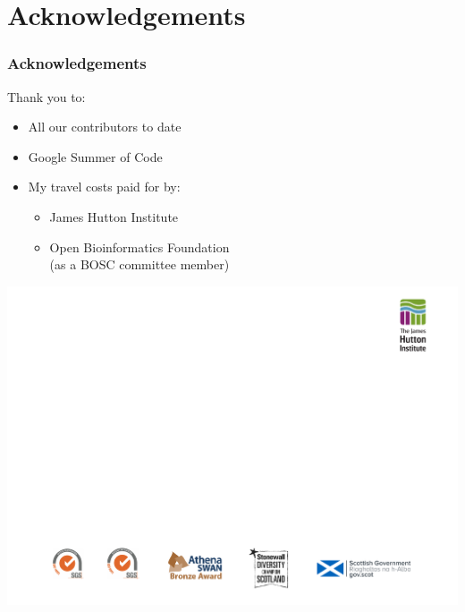 \section{Acknowledgements}

\begin{frame}
\frametitle{Acknowledgements}
Thank you to:
\begin{itemize}
    \item All our contributors to date
    \item Google Summer of Code
    \item My travel costs paid for by:
    \begin{itemize}
       \item James Hutton Institute
       \item Open Bioinformatics Foundation \\
             (as a BOSC committee member)
    \end{itemize}
\end{itemize}

\center\includegraphics[width=0.9\paperwidth]{../images/Hutton-thanks-banner}
\end{frame}


